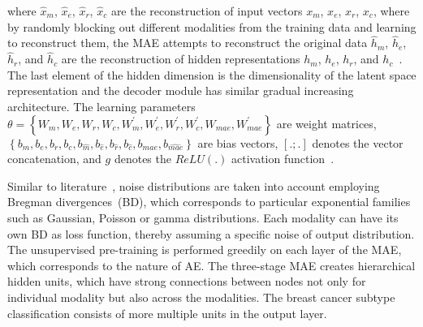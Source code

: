 \hspace*{3.5mm} where $\hat{x}_{m}$, $\hat{x}_{e}$,  $\hat{x}_{r}$, $\hat{x}_{c}$ are the reconstruction of input vectors $x_{m}$, $x_{e}$, $x_{r}$, $x_{c}$, where by randomly blocking out different modalities from the training data and learning to reconstruct them, the MAE attempts to reconstruct the original data $\hat{h}_{m}$, $\hat{h}_{e}$, $\hat{h}_{r}$, and $\hat{h}_{c}$ are the reconstruction of hidden representations ${h}_{m}$, ${h}_{e}$, ${h}_{r}$, and ${h}_{c}$~\cite{wang2018associativemulti}. The last element of the hidden dimension is the dimensionality of the latent space representation and the decoder module has similar gradual increasing architecture. The learning parameters $   \theta=\left\{W_{m},W_{e},W_{r},W_{c},W_{m}^{\prime},W_{e}^{\prime},W_{r}^{\prime},W_{c}^{\prime},W_{mae},W_{mae}^{\prime}\right\}$ are weight matrices, $\left\{b_{m}, b_{e}, b_{r}, b_{c}, b_{\hat{m}}, b_{\hat{e}}, b_{\hat{r}}, b_{\hat{c}}, b_{mae}, b_{\hat{mae}}\right\}$ are bias vectors, $[.;.]$ denotes the vector concatenation, and $g$ denotes the $ReLU(.)$ activation function~\cite{wang2018associativemulti}. 

\hspace*{3.5mm} Similar to literature~\cite{wang2018associativemulti,serban2016multi}, noise distributions are taken into account employing Bregman divergences~(BD), which corresponds to particular exponential families such as Gaussian, Poisson or gamma distributions. Each modality can have its own BD as loss function, thereby assuming a specific noise of output distribution. The unsupervised pre-training is performed greedily on each layer of the MAE, which corresponds to the nature of AE. The three-stage MAE creates hierarchical hidden units, which have strong connections between nodes not only for individual modality but also across the modalities. 
The breast cancer subtype classification 
consists of more multiple units in the output layer. 


